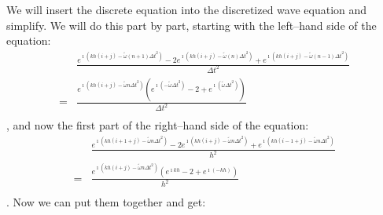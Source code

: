 \documentclass[12pt, a4paper]{article}
\begin{document}
We will insert the discrete equation into the discretized wave equation and simplify.
We will do this part by part, starting with the left--hand side of the equation:
\begin{align*}
    &\frac{e^{\imath (kh(i+j) - \tilde{\omega} (n+1) \Delta t^2)} 
        - 2 e^{\imath (kh(i+j) - \tilde{\omega} (n) \Delta t^2)}
        + e^{\imath (kh(i+j) - \tilde{\omega} (n-1) \Delta t^2)}}{\Delta t^2} \\
    = &\frac{e^{\imath (kh(i+j) - \tilde{\omega} n \Delta t^2)}(e^{\imath ( - \tilde{\omega} \Delta t^2)} 
        - 2 + e^{\imath (\tilde{\omega} \Delta t^2)})}{\Delta t^2} \\
\end{align*},
and now the first part of the right--hand side of the equation:
\begin{align*}
    &\frac{e^{\imath (kh(i+1+j) - \tilde{\omega} n \Delta t^2)} 
        - 2 e^{\imath (kh(i+j) - \tilde{\omega} n \Delta t^2)}
        + e^{\imath (kh(i-1+j) - \tilde{\omega} n \Delta t^2)}}{h^2} \\
    = &\frac{ e^{\imath (kh(i+j) - \tilde{\omega} n \Delta t^2)} (e^{\imath kh} 
        - 2
        + e^{\imath (-kh)})}{h^2} \\
\end{align*}.
Now we can put them together and get:
\end{document}
